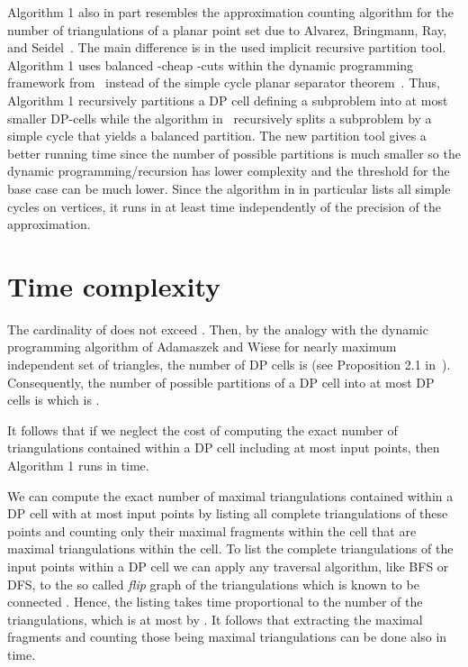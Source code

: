 \documentclass[a4paper]{article}
\begin{document}
Algorithm 1 also in part resembles the approximation counting algorithm
for the number of triangulations of a planar point
set due to Alvarez, Bringmann, Ray, and Seidel~\cite{ABRS13}.
The main difference is in the used implicit recursive partition
tool. Algorithm 1 uses balanced -cheap -cuts
within the dynamic programming framework from~\cite{AW13}
instead of the simple cycle planar
separator theorem~\cite{ABRS13,M86}.
Thus, Algorithm 1 recursively partitions 
a DP cell defining a subproblem into
at most  smaller DP-cells while the
algorithm in~\cite{ABRS13} recursively
splits a subproblem by a simple cycle
that yields a balanced partition. 
The
new partition tool gives a better running time since the number of
possible partitions is much smaller so the dynamic
programming/recursion has lower complexity and the threshold for the
base case can be much lower.  Since the algorithm in \cite{ABRS13} in
particular lists all simple cycles on  vertices, it runs
in at least  time independently of the
precision of the approximation.


\section{Time complexity}

The cardinality of  does not exceed .
Then, by the analogy with the dynamic
programming algorithm of Adamaszek and Wiese for
nearly maximum independent set
of triangles, the number
of DP cells is 
(see Proposition 2.1 in~\cite{AW14}).
Consequently, the number of possible
partitions of a DP cell into at most
 DP cells is 
which is  .

It follows that if we
neglect the cost of computing
the exact number of triangulations
contained within a DP cell including
at most  input points, then
Algorithm 1
runs in  time.


We can compute the exact
number of maximal triangulations contained
within a DP cell with at most
 input points   by
listing all complete triangulations
of these points and counting
only their maximal fragments
within the cell that are
maximal triangulations within the cell.
To list 
the complete triangulations
of the input points within a DP cell
we can apply any traversal
algorithm, like BFS or DFS, to
the so called {\em flip} graph
 of the triangulations which
is known to be connected \cite{S78}.
Hence, the listing takes
time proportional
to the number of
the triangulations, which
is at most  by \cite{SS11}.
It follows that
extracting the maximal fragments
and counting those
being maximal triangulations can be done
also in  time.
\end{document}
